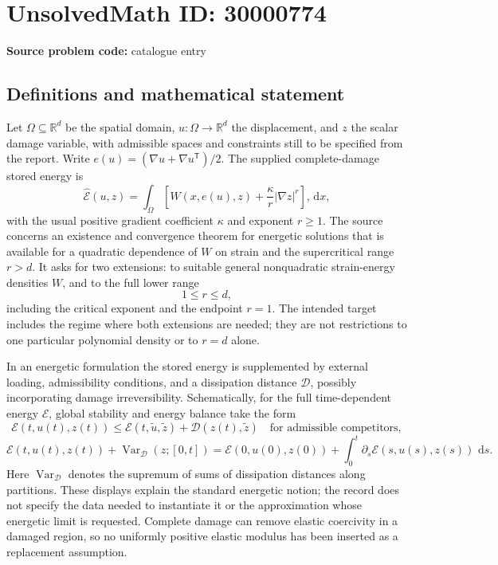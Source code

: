 \documentclass[11pt]{article}
\newcommand{\R}{\mathbb{R}}
\newcommand{\dd}{\,\mathrm{d}}
\begin{document}
\section*{UnsolvedMath ID: 30000774}
\textbf{Source problem code:} catalogue entry
\subsection{Definitions and mathematical statement}
Let \(\Omega\subseteq\R^d\) be the spatial domain, \(u:\Omega\to\R^d\) the displacement, and \(z\) the scalar damage variable, with admissible spaces and constraints still to be specified from the report. Write \(e(u)=(\nabla u+\nabla u^{\mathsf T})/2\). The supplied complete-damage stored energy is
\[
 \widehat{\mathcal E}(u,z)=\int_\Omega
 \left[W(x,e(u),z)+\frac{\kappa}{r}|\nabla z|^r\right],\dd x,
\]
with the usual positive gradient coefficient \(\kappa\) and exponent \(r\geq1\). The source concerns an existence and convergence theorem for energetic solutions that is available for a quadratic dependence of \(W\) on strain and the supercritical range \(r>d\). It asks for two extensions: to suitable general nonquadratic strain-energy densities \(W\), and to the full lower range
\[
 1\leq r\leq d,
\]
including the critical exponent and the endpoint \(r=1\). The intended target includes the regime where both extensions are needed; they are not restrictions to one particular polynomial density or to \(r=d\) alone.

In an energetic formulation the stored energy is supplemented by external loading, admissibility conditions, and a dissipation distance \(\mathcal D\), possibly incorporating damage irreversibility. Schematically, for the full time-dependent energy \(\mathcal E\), global stability and energy balance take the form
\[
 \mathcal E(t,u(t),z(t))\leq
 \mathcal E(t,\widetilde u,\widetilde z)+\mathcal D(z(t),\widetilde z)
 \quad\text{for admissible competitors},
\]
\[
 \mathcal E(t,u(t),z(t))+\operatorname{Var}_{\mathcal D}(z;[0,t])
 =\mathcal E(0,u(0),z(0))+
   \int_0^t\partial_s\mathcal E(s,u(s),z(s))\,\dd s.
\]
Here \(\operatorname{Var}_{\mathcal D}\) denotes the supremum of sums of dissipation distances along partitions. These displays explain the standard energetic notion; the record does not specify the data needed to instantiate it or the approximation whose energetic limit is requested. Complete damage can remove elastic coercivity in a damaged region, so no uniformly positive elastic modulus has been inserted as a replacement assumption.
\end{document}
